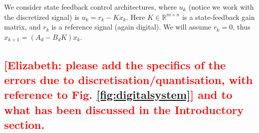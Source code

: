\documentclass[twocolumn]{autart}    %
\newcommand{\mat}[1]{{#1}}
\renewcommand{\vec}[1]{{#1}}
\begin{document}
We consider state feedback control architectures, 
where $u_k$ (notice we work with the discretized signal) is $u_k = r_{k} - K x_k$. 
Here $K \in \mathbb{R}^{m \times n}$ is a state-feedback gain matrix, 
and $r_{k}$ is a reference signal (again digital). 
We will assume $r_k=0$, thus 
$\vec{x}_{k+1}=(\mat{A}_d-\mat{B}_d\mat{K})\vec{x}_k$. 

\subsection{\textcolor{red}{[Elizabeth: please add the specifics of the errors due to discretisation/quantisation, with reference to Fig. \ref{fig:digitalsystem}] and to what has been discussed in the Introductory section.}}
\end{document}
